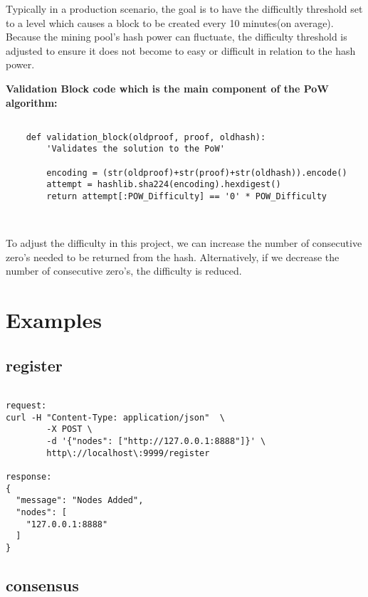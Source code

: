 Typically in a production scenario, the goal is to have the
difficultly threshold set to a level which causes a block to be
created every 10 minutes(on average). Because the mining pool's hash
power can fluctuate, the difficulty threshold is adjusted to ensure it
does not become to easy or difficult in relation to the hash
power.~\cite{hid-sp18-414-www-pow-vs-pos}

\bigskip
\noindent
\textbf{Validation Block code which is the main component of the PoW algorithm:}
\begin{footnotesize}
\begin{verbatim}

    def validation_block(oldproof, proof, oldhash):
        'Validates the solution to the PoW'

        encoding = (str(oldproof)+str(proof)+str(oldhash)).encode()
        attempt = hashlib.sha224(encoding).hexdigest()
        return attempt[:POW_Difficulty] == '0' * POW_Difficulty

        
\end{verbatim}
\end{footnotesize}

To adjust the difficulty in this project, we can increase the number
of consecutive zero's needed to be returned from the
hash. Alternatively, if we decrease the number of consecutive zero's,
the difficulty is reduced.

\section{Examples}

\subsection{register}

\bigskip
\noindent
\begin{footnotesize}
\begin{verbatim}

request:
curl -H "Content-Type: application/json"  \
        -X POST \
        -d '{"nodes": ["http://127.0.0.1:8888"]}' \
        http\://localhost\:9999/register

response:
{
  "message": "Nodes Added",
  "nodes": [
    "127.0.0.1:8888"
  ]
}

\end{verbatim}
\end{footnotesize}

\subsection{consensus}

